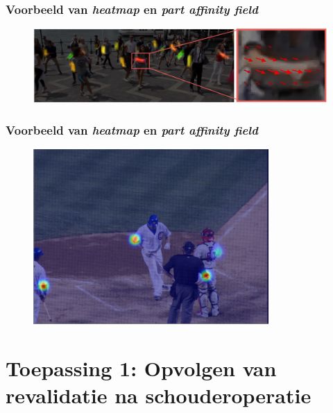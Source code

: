 \documentclass
   [kulak] %
   {kulakbeamer}
\begin{document}
\begin{frame}
\frametitle{Voorbeeld van \textit{heatmap} en \textit{part affinity field}}
\begin{figure}
	\centering
	\includegraphics[width=\textwidth]{PAF}
\end{figure}
\end{frame}
\begin{frame}
\frametitle{Voorbeeld van \textit{heatmap} en \textit{part affinity field}}
	\begin{figure}
		\centering
		\includegraphics[width=0.8\textwidth]{heatmap_1}
	\end{figure}
\end{frame}



\section{Toepassing 1: Opvolgen van revalidatie na schouderoperatie}
\end{document}

